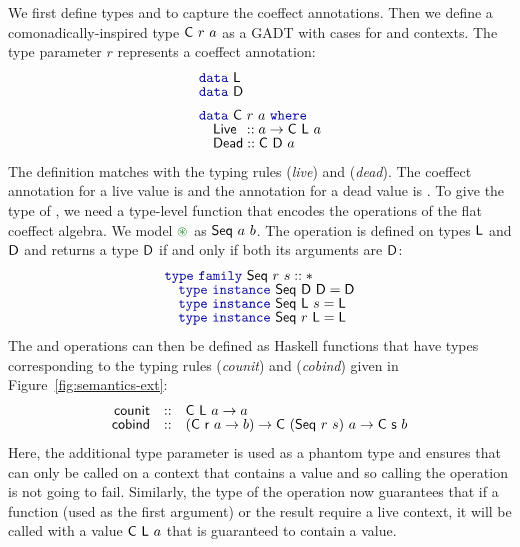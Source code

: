 We first define types  and  to capture the coeffect annotations.
Then we define a comonadically-inspired type $\textnormal{\sffamily C}~r~a$ as a GADT with cases for
 and  contexts. The type parameter $r$ represents a coeffect
annotation:
%
\begin{equation*}
\begin{array}{l}
\kvd{data}~\ident{L} \\[-0.2em]
\kvd{data}~\ident{D} \\[0.5em]
\kvd{data}~\ident{C}~r~a~\kvd{where} \\[-0.2em]
\quad \ident{Live} \hspace{0.45em}:: a \rightarrow \ident{C}~\ident{L}~a\\[-0.2em]
\quad \ident{Dead} :: \ident{C}~\ident{D}~a
\end{array}
\end{equation*}
%
The definition matches with the typing rules (\emph{live}) and (\emph{dead}). The coeffect
annotation for a live value is  and the annotation for a dead value is .
To give the type of , we need a type-level function that encodes the operations
of the flat coeffect algebra. We model $\cseq$ as $\textnormal{\sffamily Seq}~a~b$. The operation is defined
on types $\textnormal{\sffamily L}$ and $\textnormal{\sffamily D}$ and returns a type $\textnormal{\sffamily D}$ if and only if both its
arguments are $\textnormal{\sffamily D}$:
%
\begin{equation*}
\begin{array}{l}
\kvd{type}~\kvd{family}~\ident{Seq}~r~s :: *\\[-0.2em]
\quad \kvd{type}~\kvd{instance}~\ident{Seq}~\ident{D}~\ident{D} = \ident{D}\\[-0.2em]
\quad \kvd{type}~\kvd{instance}~\ident{Seq}~\ident{L}~s = \ident{L}\\[-0.2em]
\quad \kvd{type}~\kvd{instance}~\ident{Seq}~r~\ident{L} = \ident{L}
\end{array}
\end{equation*}
%
The  and  operations can then be defined as Haskell functions
that have types corresponding to the typing rules (\emph{counit}) and (\emph{cobind}) given
in Figure~\ref{fig:semantics-ext}:
%
\begin{equation*}
\begin{array}{rcl}
\textnormal{\sffamily counit} &::& \textnormal{\sffamily C}~\textnormal{\sffamily L}~a \rightarrow a \\[-0.2em]
\textnormal{\sffamily cobind} &::& (\textnormal{\sffamily C}~\textnormal{\sffamily r}~a \rightarrow b) \rightarrow \textnormal{\sffamily C}~(\textnormal{\sffamily Seq}~r~s)~a \rightarrow \textnormal{\sffamily C}~\textnormal{\sffamily s}~b
\end{array}
\end{equation*}
%
Here, the additional type parameter is used as a phantom type \cite{types-phantom} and ensures that
 can only be called on a context that contains a value and so calling the operation
is not going to fail. Similarly, the type of the  operation now guarantees that if a
function (used as the first argument) or the result require a live context, it will be called with
a value $\textnormal{\sffamily C}~\textnormal{\sffamily L}~a$ that is guaranteed to contain a value.

